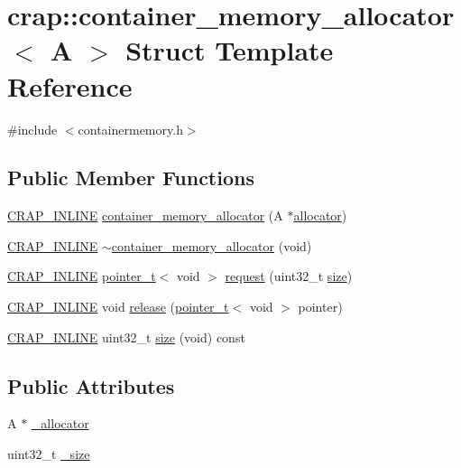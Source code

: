 \hypertarget{structcrap_1_1container__memory__allocator}{\section{crap\+:\+:container\+\_\+memory\+\_\+allocator$<$ A $>$ Struct Template Reference}
\label{structcrap_1_1container__memory__allocator}
}


{\ttfamily \#include $<$containermemory.\+h$>$}

\subsection*{Public Member Functions}
\begin{DoxyCompactItemize}
\item 
\hyperlink{config__x86_8h_a5a40526b8d842e7ff731509998bb0f1c}{C\+R\+A\+P\+\_\+\+I\+N\+L\+I\+N\+E} \hyperlink{structcrap_1_1container__memory__allocator_a9a27ff691852615b2e9a680866ce4cbe}{container\+\_\+memory\+\_\+allocator} (A $\ast$\hyperlink{classcrap_1_1allocator}{allocator})
\item 
\hyperlink{config__x86_8h_a5a40526b8d842e7ff731509998bb0f1c}{C\+R\+A\+P\+\_\+\+I\+N\+L\+I\+N\+E} \hyperlink{structcrap_1_1container__memory__allocator_ae442c6e21081a592f88c474ae5f6e03b}{$\sim$container\+\_\+memory\+\_\+allocator} (void)
\item 
\hyperlink{config__x86_8h_a5a40526b8d842e7ff731509998bb0f1c}{C\+R\+A\+P\+\_\+\+I\+N\+L\+I\+N\+E} \hyperlink{structcrap_1_1pointer__t}{pointer\+\_\+t}$<$ void $>$ \hyperlink{structcrap_1_1container__memory__allocator_a38d4f76005cf5686466c9c3de1879d98}{request} (uint32\+\_\+t \hyperlink{structcrap_1_1container__memory__allocator_a6f723fb0df67f37b9158355d393a1af7}{size})
\item 
\hyperlink{config__x86_8h_a5a40526b8d842e7ff731509998bb0f1c}{C\+R\+A\+P\+\_\+\+I\+N\+L\+I\+N\+E} void \hyperlink{structcrap_1_1container__memory__allocator_ab07f891012fafa4ff9dff7a1a6cdd04e}{release} (\hyperlink{structcrap_1_1pointer__t}{pointer\+\_\+t}$<$ void $>$ pointer)
\item 
\hyperlink{config__x86_8h_a5a40526b8d842e7ff731509998bb0f1c}{C\+R\+A\+P\+\_\+\+I\+N\+L\+I\+N\+E} uint32\+\_\+t \hyperlink{structcrap_1_1container__memory__allocator_a6f723fb0df67f37b9158355d393a1af7}{size} (void) const 
\end{DoxyCompactItemize}
\subsection*{Public Attributes}
\begin{DoxyCompactItemize}
\item 
A $\ast$ \hyperlink{structcrap_1_1container__memory__allocator_a6c4b2c56ca010ac510a93d4f5581ba94}{\+\_\+allocator}
\item 
uint32\+\_\+t \hyperlink{structcrap_1_1container__memory__allocator_afb1717450eb7b0b9d03321fa73a5150f}{\+\_\+size}
\end{DoxyCompactItemize}


